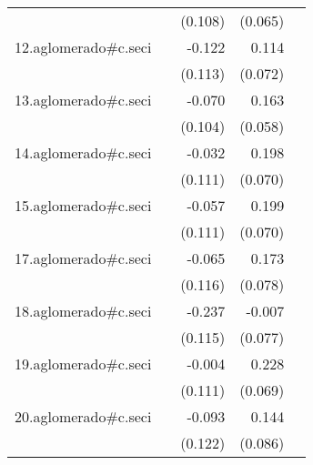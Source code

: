 {\begin{longtable}{l*{4}{D{.}{.}{-1}}}
            &                     &     (0.108)         &     (0.065)         &                     \\
\addlinespace
12.aglomerado#c.seci&                     &      -0.122         &       0.114         &                     \\
            &                     &     (0.113)         &     (0.072)         &                     \\
\addlinespace
13.aglomerado#c.seci&                     &      -0.070         &       0.163\sym{**} &                     \\
            &                     &     (0.104)         &     (0.058)         &                     \\
\addlinespace
14.aglomerado#c.seci&                     &      -0.032         &       0.198\sym{**} &                     \\
            &                     &     (0.111)         &     (0.070)         &                     \\
\addlinespace
15.aglomerado#c.seci&                     &      -0.057         &       0.199\sym{**} &                     \\
            &                     &     (0.111)         &     (0.070)         &                     \\
\addlinespace
17.aglomerado#c.seci&                     &      -0.065         &       0.173\sym{*}  &                     \\
            &                     &     (0.116)         &     (0.078)         &                     \\
\addlinespace
18.aglomerado#c.seci&                     &      -0.237\sym{*}  &      -0.007         &                     \\
            &                     &     (0.115)         &     (0.077)         &                     \\
\addlinespace
19.aglomerado#c.seci&                     &      -0.004         &       0.228\sym{**} &                     \\
            &                     &     (0.111)         &     (0.069)         &                     \\
\addlinespace
20.aglomerado#c.seci&                     &      -0.093         &       0.144         &                     \\
            &                     &     (0.122)         &     (0.086)         &                     \\

\end{longtable}}
